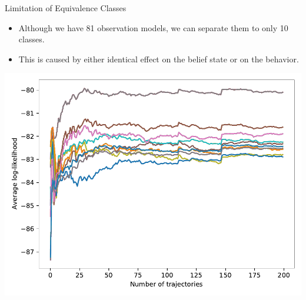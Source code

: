 \documentclass[
english,%
aspectratio=169,%
color={accentcolor=3b},
logo=true,%
colorframetitle=false,%
]{tudabeamer}
\begin{document}
\begin{frame}{Limitation of Equivalence Classes}
\vspace{-5pt}
\begin{itemize}
	\item Although we have 81 observation models, we can separate them to only 10 classes.
	\item This is caused by either identical effect on the belief state or on the behavior.
\end{itemize}
\vspace{+5pt}
\centering
\includegraphics[height=0.6\textheight]{figures/llh_exactUpdate_81model}

\end{frame}
\end{document}

